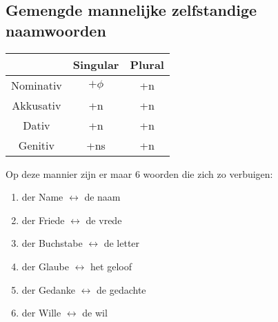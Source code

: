 \documentclass[main.tex]{subfiles}
\begin{document}
\subsection{Gemengde mannelijke zelfstandige naamwoorden}
\begin{minipage}[t]{0,33\textwidth}
\begin{tabular}{|c|c|c|}
\hline 
\rowcolor{gray}
 & Singular & Plural \\ 
\hline 
\cellcolor[gray]{0.8}Nominativ & $+\phi$ & +n \\ 
\hline 
\cellcolor[gray]{0.8}Akkusativ & +n & +n \\ 
\hline 
\cellcolor[gray]{0.8}Dativ & +n & +n \\ 
\hline 
\cellcolor[gray]{0.8}Genitiv & +ns & +n \\ 
\hline 
\end{tabular} 
\end{minipage}
\begin{minipage}{0,67\textwidth}
Op deze mannier zijn er maar 6 woorden die zich zo verbuigen:
\begin{enumerate}
\item der Name $\leftrightarrow$ de naam
\item der Friede $\leftrightarrow$ de vrede
\item der Buchstabe $\leftrightarrow$ de letter
\item der Glaube $\leftrightarrow$ het geloof
\item der Gedanke $\leftrightarrow$ de gedachte
\item der Wille $\leftrightarrow$ de wil
\end{enumerate}
\end{minipage}
\end{document}
